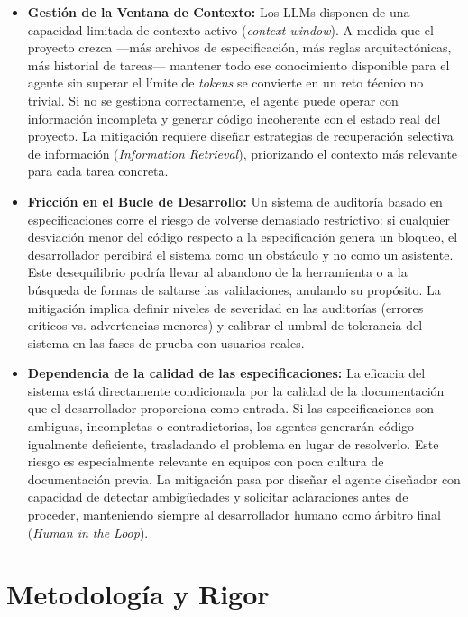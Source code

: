 \documentclass[11pt, letterpaper]{article}
\begin{document}
\begin{itemize}
    \item \textbf{Gestión de la Ventana de Contexto:} Los LLMs disponen de una capacidad limitada de contexto activo (\textit{context window}). A medida que el proyecto crezca —más archivos de especificación, más reglas arquitectónicas, más historial de tareas— mantener todo ese conocimiento disponible para el agente sin superar el límite de \textit{tokens} se convierte en un reto técnico no trivial. Si no se gestiona correctamente, el agente puede operar con información incompleta y generar código incoherente con el estado real del proyecto. La mitigación requiere diseñar estrategias de recuperación selectiva de información (\textit{Information Retrieval}), priorizando el contexto más relevante para cada tarea concreta.

    \item \textbf{Fricción en el Bucle de Desarrollo:} Un sistema de auditoría basado en especificaciones corre el riesgo de volverse demasiado restrictivo: si cualquier desviación menor del código respecto a la especificación genera un bloqueo, el desarrollador percibirá el sistema como un obstáculo y no como un asistente. Este desequilibrio podría llevar al abandono de la herramienta o a la búsqueda de formas de saltarse las validaciones, anulando su propósito. La mitigación implica definir niveles de severidad en las auditorías (errores críticos vs. advertencias menores) y calibrar el umbral de tolerancia del sistema en las fases de prueba con usuarios reales.

    \item \textbf{Dependencia de la calidad de las especificaciones:} La eficacia del sistema está directamente condicionada por la calidad de la documentación que el desarrollador proporciona como entrada. Si las especificaciones son ambiguas, incompletas o contradictorias, los agentes generarán código igualmente deficiente, trasladando el problema en lugar de resolverlo. Este riesgo es especialmente relevante en equipos con poca cultura de documentación previa. La mitigación pasa por diseñar el agente diseñador con capacidad de detectar ambigüedades y solicitar aclaraciones antes de proceder, manteniendo siempre al desarrollador humano como árbitro final (\textit{Human in the Loop}).
\end{itemize}

\newpage

\section{Metodología y Rigor}
\end{document}
